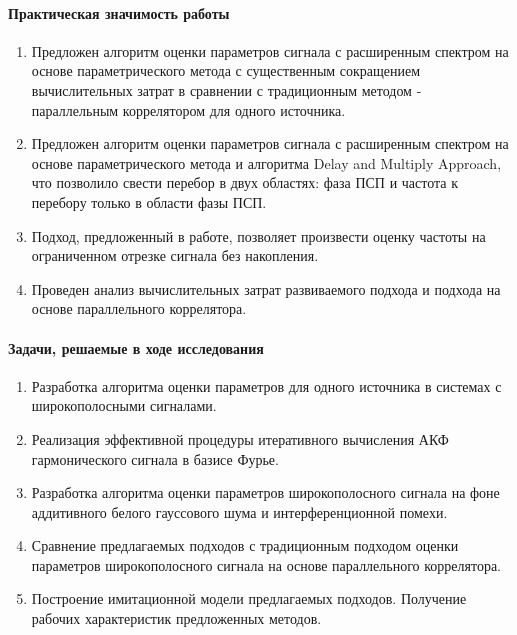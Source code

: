 \paragraph{Практическая значимость работы}
\begin{enumerate}
	\item {Предложен алгоритм оценки параметров сигнала с расширенным спектром на основе параметрического метода с существенным
		сокращением вычислительных затрат в сравнении с традиционным методом - параллельным коррелятором для одного источника.}
	\item {Предложен алгоритм оценки параметров сигнала с расширенным спектром на основе параметрического метода и алгоритма
		Delay and Multiply Approach,
		что позволило свести перебор в двух областях: фаза ПСП и частота к перебору только в области фазы ПСП.}
	\item {Подход, предложенный в работе, позволяет произвести оценку частоты на ограниченном отрезке сигнала без накопления.}
	\item {Проведен анализ вычислительных затрат развиваемого подхода и подхода на основе параллельного коррелятора.}
\end{enumerate}

\paragraph{Задачи, решаемые в ходе исследования}
\begin{enumerate}
	\item {Разработка алгоритма оценки параметров для одного источника в системах с широкополосными сигналами.}
	\item {Реализация эффективной процедуры итеративного вычисления АКФ гармонического сигнала в базисе Фурье.}
	\item {Разработка алгоритма оценки параметров широкополосного сигнала на фоне аддитивного белого гауссового шума и
		интерференционной помехи.}
	\item {Сравнение предлагаемых подходов с традиционным подходом оценки параметров широкополосного сигнала на основе параллельного коррелятора.}
	\item {Построение имитационной модели предлагаемых подходов. Получение рабочих характеристик предложенных методов.}
\end{enumerate}

